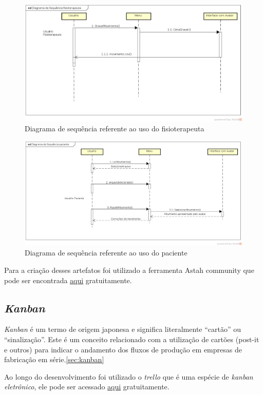 \begin{figure}[H]
\centering
\includegraphics [keepaspectratio=true,scale=0.45]{figuras/diagramaFisio.eps}

\caption{Diagrama de sequência referente ao uso do fisioterapeuta}
\label{diagramaFisio}
\end{figure}


\begin{figure}[H]
\centering
\includegraphics [keepaspectratio=true,scale=0.45]{figuras/diagramaPaciente.eps}

\caption{Diagrama de sequência referente ao uso do paciente}
\label{diagramaPaciente}
\end{figure}

  Para a criação desses artefatos foi utilizado a ferramenta Astah community que pode ser encontrada \href{http://astah.net/download#community}{aqui} gratuitamente.


\subsection{\textit{Kanban}}\label{sub:kanban}
  \textit{Kanban} é um termo de origem japonesa e significa literalmente “cartão” ou “sinalização”.
Este é um conceito relacionado com a utilização de cartões (post-it e outros) para indicar o andamento dos fluxos de produção em empresas de fabricação em série.\ref{sec:kanban}

  Ao longo do desenvolvimento foi utilizado o \textit{trello}  que é uma espécie de \textit{kanban eletrônico}, ele pode ser acessado \href{https://trello.com/}{aqui} gratuitamente.
